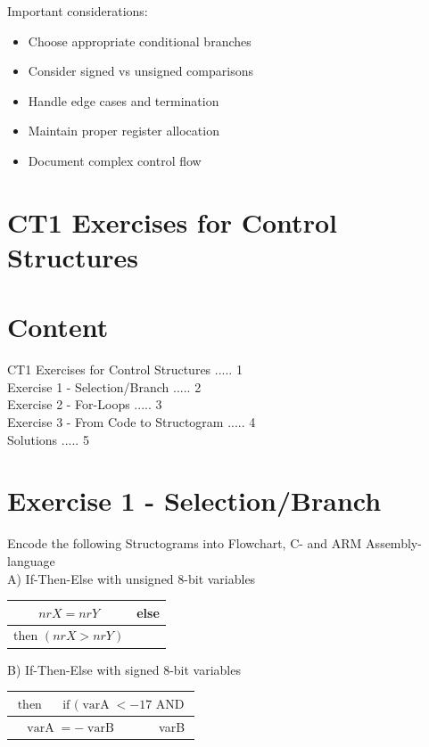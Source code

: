 \begin{remark}
Important considerations:
\begin{itemize}
  \item Choose appropriate conditional branches
  \item Consider signed vs unsigned comparisons
  \item Handle edge cases and termination
  \item Maintain proper register allocation
  \item Document complex control flow
\end{itemize}
\end{remark}

\section*{CT1 Exercises for Control Structures}
\section*{Content}
CT1 Exercises for Control Structures ..... 1\\
Exercise 1 - Selection/Branch ..... 2\\
Exercise 2 - For-Loops ..... 3\\
Exercise 3 - From Code to Structogram ..... 4\\
Solutions ..... 5

\section*{Exercise 1 - Selection/Branch}
Encode the following Structograms into Flowchart, C- and ARM Assembly-language\\
A) If-Then-Else with unsigned 8-bit variables

\begin{center}
\begin{tabular}{|c|c|}
\hline
$n r X=n r Y$ & else \\
\hline
then $(n r X>n r Y)$ &  \\
\hline
\end{tabular}
\end{center}

B) If-Then-Else with signed 8-bit variables

\begin{center}
\begin{tabular}{|c|c|c|}
\hline
\multicolumn{3}{|l|}{\(
\text { then } \quad \text { if }(\operatorname{varA}<-17 \text { AND }
\)} \\
\hline
$\operatorname{varA}=-\operatorname{varB}$ &  & varB \\
\hline
\end{tabular}
\end{center}

